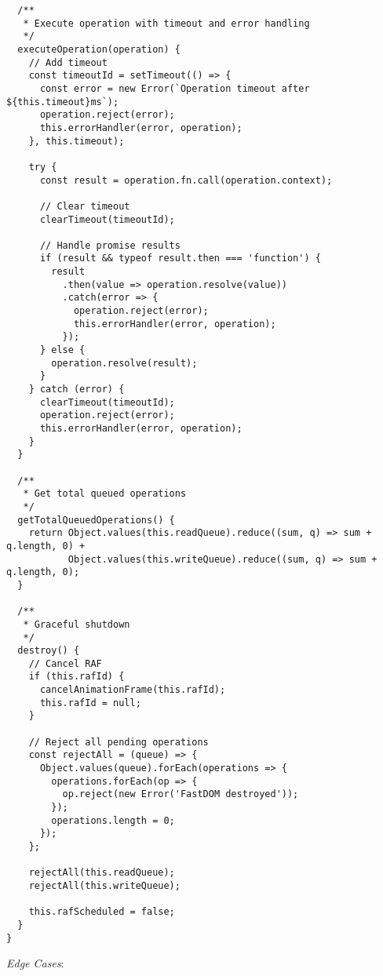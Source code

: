 \documentclass[11pt]{article}
\begin{document}
\begin{verbatim}
  /**
   * Execute operation with timeout and error handling
   */
  executeOperation(operation) {
    // Add timeout
    const timeoutId = setTimeout(() => {
      const error = new Error(`Operation timeout after ${this.timeout}ms`);
      operation.reject(error);
      this.errorHandler(error, operation);
    }, this.timeout);
    
    try {
      const result = operation.fn.call(operation.context);
      
      // Clear timeout
      clearTimeout(timeoutId);
      
      // Handle promise results
      if (result && typeof result.then === 'function') {
        result
          .then(value => operation.resolve(value))
          .catch(error => {
            operation.reject(error);
            this.errorHandler(error, operation);
          });
      } else {
        operation.resolve(result);
      }
    } catch (error) {
      clearTimeout(timeoutId);
      operation.reject(error);
      this.errorHandler(error, operation);
    }
  }
  
  /**
   * Get total queued operations
   */
  getTotalQueuedOperations() {
    return Object.values(this.readQueue).reduce((sum, q) => sum + q.length, 0) +
           Object.values(this.writeQueue).reduce((sum, q) => sum + q.length, 0);
  }
  
  /**
   * Graceful shutdown
   */
  destroy() {
    // Cancel RAF
    if (this.rafId) {
      cancelAnimationFrame(this.rafId);
      this.rafId = null;
    }
    
    // Reject all pending operations
    const rejectAll = (queue) => {
      Object.values(queue).forEach(operations => {
        operations.forEach(op => {
          op.reject(new Error('FastDOM destroyed'));
        });
        operations.length = 0;
      });
    };
    
    rejectAll(this.readQueue);
    rejectAll(this.writeQueue);
    
    this.rafScheduled = false;
  }
}
\end{verbatim}

\emph{Edge Cases}:
\end{document}
